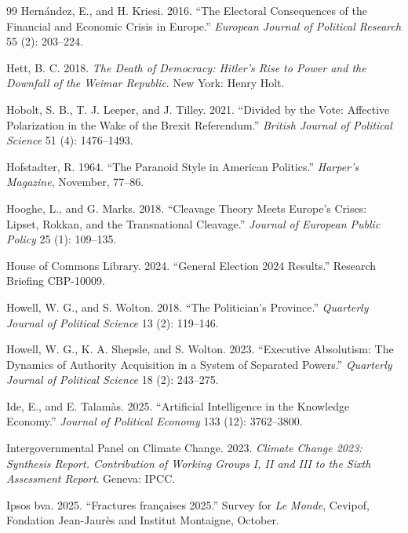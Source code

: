 \documentclass[12pt,letterpaper]{article}
\begin{document}
\begin{thebibliography}{99}
Hern\'{a}ndez, E., and H. Kriesi. 2016. ``The Electoral Consequences of the Financial and Economic Crisis in Europe.'' \textit{European Journal of Political Research} 55 (2): 203--224.

Hett, B. C. 2018. \textit{The Death of Democracy: Hitler's Rise to Power and the Downfall of the Weimar Republic}. New York: Henry Holt.

Hobolt, S. B., T. J. Leeper, and J. Tilley. 2021. ``Divided by the Vote: Affective Polarization in the Wake of the Brexit Referendum.'' \textit{British Journal of Political Science} 51 (4): 1476--1493.

Hofstadter, R. 1964. ``The Paranoid Style in American Politics.'' \textit{Harper's Magazine}, November, 77--86.

Hooghe, L., and G. Marks. 2018. ``Cleavage Theory Meets Europe's Crises: Lipset, Rokkan, and the Transnational Cleavage.'' \textit{Journal of European Public Policy} 25 (1): 109--135.

House of Commons Library. 2024. ``General Election 2024 Results.'' Research Briefing CBP-10009.

Howell, W. G., and S. Wolton. 2018. ``The Politician's Province.'' \textit{Quarterly Journal of Political Science} 13 (2): 119--146.

Howell, W. G., K. A. Shepsle, and S. Wolton. 2023. ``Executive Absolutism: The Dynamics of Authority Acquisition in a System of Separated Powers.'' \textit{Quarterly Journal of Political Science} 18 (2): 243--275.

Ide, E., and E. Talam\`{a}s. 2025. ``Artificial Intelligence in the Knowledge Economy.'' \textit{Journal of Political Economy} 133 (12): 3762--3800.

Intergovernmental Panel on Climate Change. 2023. \textit{Climate Change 2023: Synthesis Report. Contribution of Working Groups I, II and III to the Sixth Assessment Report}. Geneva: IPCC.

Ipsos bva. 2025. ``Fractures fran\c{c}aises 2025.'' Survey for \textit{Le Monde}, Cevipof, Fondation Jean-Jaur\`{e}s and Institut Montaigne, October.


\end{thebibliography}
\end{document}
